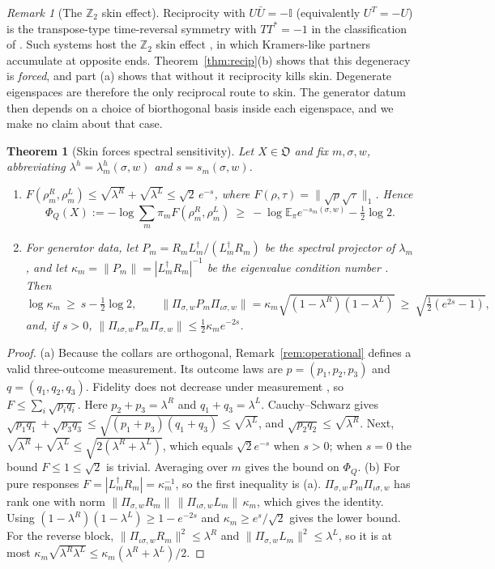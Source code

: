 \documentclass[11pt]{article}
\newtheorem{theorem}{Theorem}
\theoremstyle{definition}
\theoremstyle{remark}
\newtheorem{remark}{Remark}
\newcommand{\E}{\mathbb{E}}
\newcommand{\one}{\mathbb{I}}
\newcommand{\Obj}{\mathfrak{O}}
\newcommand{\isig}{\iota\sigma}
\begin{document}
\begin{remark}[The $\mathbb Z_2$ skin effect]\label{rem:z2}
Reciprocity with $U\bar U=-\one$ (equivalently $U^T=-U$) is the transpose-type time-reversal symmetry with $TT^*=-1$ in the classification of \cite{KSUS19}. Such systems host the $\mathbb Z_2$ skin effect \cite{OKSS20}, in which Kramers-like partners accumulate at opposite ends. Theorem~\ref{thm:recip}(b) shows that this degeneracy is \emph{forced}, and part (a) shows that without it reciprocity kills skin. Degenerate eigenspaces are therefore the only reciprocal route to skin. The generator datum then depends on a choice of biorthogonal basis inside each eigenspace, and we make no claim about that case.
\end{remark}

\begin{theorem}[Skin forces spectral sensitivity]\label{thm:sens}
Let $X\in\Obj$ and fix $m,\sigma,w$, abbreviating $\lambda^h=\lambda^h_m(\sigma,w)$ and $s=s_m(\sigma,w)$.
\begin{enumerate}
\item[(a)] $F(\rho^R_m,\rho^L_m)\le\sqrt{\lambda^R}+\sqrt{\lambda^L}\le\sqrt2\,e^{-s}$, where $F(\rho,\tau)=\|\sqrt\rho\sqrt\tau\|_1$. Hence
\[
\Phi_Q(X):=-\log\sum_m\pi_mF(\rho^R_m,\rho^L_m)\ \ge\ -\log\E_\pi e^{-s_m(\sigma,w)}-\tfrac12\log2 .
\]
\item[(b)] For generator data, let $P_m=R_mL_m^\dagger/(L_m^\dagger R_m)$ be the spectral projector of $\lambda_m$, and let $\kappa_m=\|P_m\|=|L_m^\dagger R_m|^{-1}$ be the eigenvalue condition number \cite{Wil65,TE05}. Then
\[
\log\kappa_m\ \ge\ s-\tfrac12\log 2,\qquad
\|\Pi_{\sigma,w}P_m\Pi_{\isig,w}\|=\kappa_m\sqrt{(1-\lambda^R)(1-\lambda^L)}\ \ge\ \sqrt{\tfrac12(e^{2s}-1)},
\]
and, if $s>0$, $\|\Pi_{\isig,w}P_m\Pi_{\sigma,w}\|\le\frac12\kappa_me^{-2s}$.
\end{enumerate}
\end{theorem}
\begin{proof}
(a) Because the collars are orthogonal, Remark~\ref{rem:operational} defines a valid three-outcome measurement. Its outcome laws are $p=(p_1,p_2,p_3)$ and $q=(q_1,q_2,q_3)$. Fidelity does not decrease under measurement \cite{Uhl76}, so $F\le\sum_i\sqrt{p_iq_i}$. Here $p_2+p_3=\lambda^R$ and $q_1+q_3=\lambda^L$. Cauchy--Schwarz gives $\sqrt{p_1q_1}+\sqrt{p_3q_3}\le\sqrt{(p_1+p_3)(q_1+q_3)}\le\sqrt{\lambda^L}$, and $\sqrt{p_2q_2}\le\sqrt{\lambda^R}$. Next, $\sqrt{\lambda^R}+\sqrt{\lambda^L}\le\sqrt{2(\lambda^R+\lambda^L)}$, which equals $\sqrt2e^{-s}$ when $s>0$; when $s=0$ the bound $F\le1\le\sqrt2$ is trivial. Averaging over $m$ gives the bound on $\Phi_Q$.
(b) For pure responses $F=|L_m^\dagger R_m|=\kappa_m^{-1}$, so the first inequality is (a). $\Pi_{\sigma,w}P_m\Pi_{\isig,w}$ has rank one with norm $\|\Pi_{\sigma,w}R_m\|\,\|\Pi_{\isig,w}L_m\|\,\kappa_m$, which gives the identity. Using $(1-\lambda^R)(1-\lambda^L)\ge1-e^{-2s}$ and $\kappa_m\ge e^{s}/\sqrt2$ gives the lower bound. For the reverse block, $\|\Pi_{\isig,w}R_m\|^2\le\lambda^R$ and $\|\Pi_{\sigma,w}L_m\|^2\le\lambda^L$, so it is at most $\kappa_m\sqrt{\lambda^R\lambda^L}\le\kappa_m(\lambda^R+\lambda^L)/2$.
\end{proof}
\end{document}
